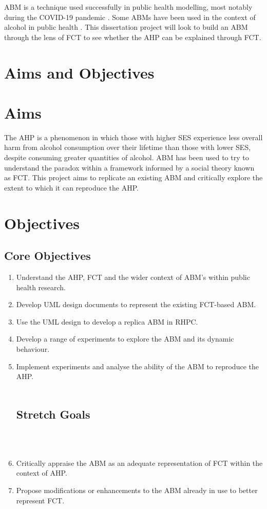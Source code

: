 \ac{ABM} is a technique used successfully in public health modelling, most notably during the COVID-19 pandemic \cite{covidABM}. Some \ac{ABM}s have been used in the context of alcohol in public health \cite{scopingReview}. This dissertation project will look to build an \ac{ABM} through the lens of \ac{FCT} to see whether the \ac{AHP} can be explained through \ac{FCT}.


\section{Aims and Objectives}

\section{Aims}
The \ac{AHP} is a phenomenon in which those with higher \ac{SES} experience less overall harm from alcohol consumption over their lifetime than those with lower \ac{SES}, despite consuming greater quantities of alcohol. \ac{ABM} has been used to try to understand the paradox within a framework informed by a social theory known as  \ac{FCT}. This project aims to replicate an existing \ac{ABM} and critically explore the extent to which it can reproduce the \ac{AHP}.


\section{Objectives}
\subsection{Core Objectives}
\begin{enumerate}%
    \item Understand the \ac{AHP}, \ac{FCT} and the wider context of ABM's within public health research. 
    \item Develop \ac{UML} design documents to represent the existing \ac{FCT}-based ABM. 
    \item Use the \ac{UML} design to develop a replica ABM in \ac{RHPC}. 
    \item Develop a range of experiments to explore the ABM and its dynamic behaviour. 
    \item Implement experiments and analyse the ability of the \ac{ABM} to reproduce the \ac{AHP}. 
\\
\\
\hline
\subsection{Stretch Goals}
\\
\\
    \item Critically appraise the \ac{ABM} as an adequate representation of \ac{FCT} within the context of \ac{AHP}. 
    \item Propose modifications or enhancements to the \ac{ABM} already in use to better represent \ac{FCT}. \end{enumerate} 









